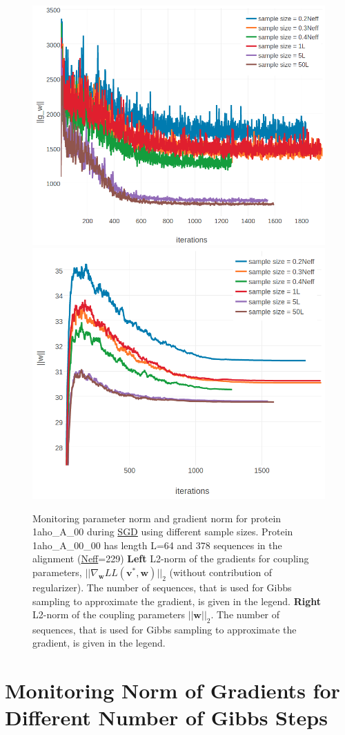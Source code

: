 \documentclass[11pt,a4paper,twoside]{book}
\renewcommand{\v}{\mathbf{v}}
\newcommand{\w}{\mathbf{w}}
\theoremstyle{definition}
\theoremstyle{definition}
\theoremstyle{remark}
\begin{document}
\begin{figure}

{\centering \includegraphics[width=0.48\linewidth]{img/full_likelihood/appendix/1ahoa00_gradient_norm_for_samplesizes} \includegraphics[width=0.48\linewidth]{img/full_likelihood/appendix/1ahoa00_parameter_norm_for_samplesizes} 

}

\caption{Monitoring parameter norm and
gradient norm for protein 1aho\_A\_00 during
\protect\hyperlink{abbrev}{SGD} using different sample sizes. Protein
1aho\_A\_00\_00 has length L=64 and 378 sequences in the alignment
(\protect\hyperlink{abbrev}{Neff}=229) \textbf{Left} L2-norm of the
gradients for coupling parameters, \(||\nabla_{\w} L\!L(\v^*, \w)||_2\)
(without contribution of regularizer). The number of sequences, that is
used for Gibbs sampling to approximate the gradient, is given in the
legend. \textbf{Right} L2-norm of the coupling parameters \(||\w||_2\).
The number of sequences, that is used for Gibbs sampling to approximate
the gradient, is given in the legend.}\label{fig:cd-samplesize-protein1ahoa00}
\end{figure}

\section{Monitoring Norm of Gradients for Different Number of Gibbs
Steps}\label{monitoring-norm-of-gradients-for-different-number-of-gibbs-steps}
\end{document}
